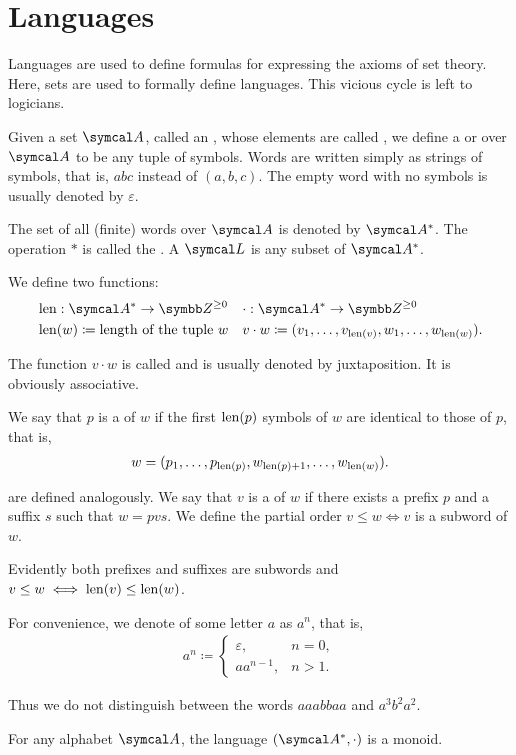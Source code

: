 \section{Languages}\label{sec:languages}

Languages are used to define formulas for expressing the axioms of set theory. Here, sets are used to formally define languages. This vicious cycle is left to logicians.

\begin{definition}\label{def:language}
  Given a set $\Cal{A}$, called an , whose elements are called , we define a  or  over $\Cal{A}$ to be any tuple of symbols. Words are written simply as strings of symbols, that is, $abc$ instead of $(a, b, c)$. The empty word with no symbols is usually denoted by $\varepsilon$.

  The set of all (finite) words over $\Cal{A}$ is denoted by $\Cal{A}^{*}$. The operation $*$ is called the . A  $\Cal{L}$ is any subset of $\Cal{A}^{*}$.

  We define two functions:
  \begin{align*}
    &\Len: \Cal{A}^{*} \to \BB{Z}^{\geq 0}
    &&\cdot: \Cal{A}^{*} \to \BB{Z}^{\geq 0}
    \\
    &\Len(w) \coloneqq \text{length of the tuple } w
    &&v \cdot w \coloneqq (v_1, \ldots, v_{\Len(v)}, w_1, \ldots, w_{\Len(w)}).
  \end{align*}

  The function $v \cdot w$ is called  and is usually denoted by juxtaposition. It is obviously associative.

  We say that $p$ is a  of $w$ if the first $\operatorname{len}(p)$ symbols of $w$ are identical to those of $p$, that is,
  \begin{align*}
    w = (p_1, \ldots, p_{\operatorname{len}(p)}, w_{\operatorname{len}(p) + 1}, \ldots, w_{\operatorname{len}(w)}).
  \end{align*}

   are defined analogously. We say that $v$ is a  of $w$ if there exists a prefix $p$ and a suffix $s$ such that $w = pvs$. We define the partial order $v \leq w \iff v$ is a subword of $w$.

  Evidently both prefixes and suffixes are subwords and $v \leq w \iff \operatorname{len}(v) \leq \operatorname{len}(w)$.

  For convenience, we denote  of some letter $a$ as $a^n$, that is,
  \begin{align*}
    a^n \coloneqq \begin{cases}
      \varepsilon, &n = 0, \\
      a a^{n-1}, &n > 1.
    \end{cases}
  \end{align*}

  Thus we do not distinguish between the words $aaabbaa$ and $a^3 b^2 a^2$.
\end{definition}

\begin{proposition}\label{thm:set_of_all_words_is_monoid}
  For any alphabet $\Cal{A}$, the language $(\Cal{A}^{*}, \cdot)$ is a monoid.
\end{proposition}
